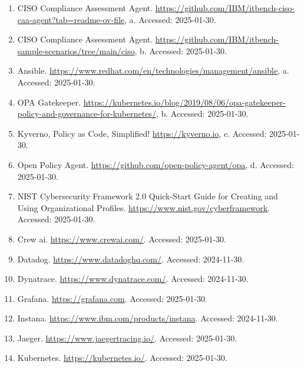 \documentclass[10pt,UTF8,fontset=fandol]{ctexart}
\begin{document}
\begin{enumerate}[leftmargin=2em,itemsep=2pt]

\item CISO Compliance Assessment Agent. \url{https://github.com/IBM/itbench-ciso-caa-agent?tab=readme-ov-file}, a. Accessed: 2025-01-30.

\item CISO Compliance Assessment Agent. \url{https://github.com/IBM/itbench-sample-scenarios/tree/main/ciso}, b. Accessed: 2025-01-30.

\item Ansible. \url{https://www.redhat.com/en/technologies/management/ansible}, a. Accessed: 2025-01-30.

\item OPA Gatekeeper. \url{https://kubernetes.io/blog/2019/08/06/opa-gatekeeper-policy-and-governance-for-kubernetes/}, b. Accessed: 2025-01-30.

\item Kyverno, Policy as Code, Simplified! \url{https://kyverno.io}, c. Accessed: 2025-01-30.

\item Open Policy Agent. \url{https://github.com/open-policy-agent/opa}, d. Accessed: 2025-01-30.

\item NIST Cybersecurity Framework 2.0 Quick-Start Guide for Creating and Using Organizational Profiles. \url{https://www.nist.gov/cyberframework}. Accessed: 2025-01-30.

\item Crew ai. \url{https://www.crewai.com/}. Accessed: 2025-01-30.

\item Datadog. \url{https://www.datadoghq.com/}. Accessed: 2024-11-30.

\item Dynatrace. \url{https://www.dynatrace.com/}. Accessed: 2024-11-30.

\item Grafana. \url{https://grafana.com}. Accessed: 2025-01-30.

\item Instana. \url{https://www.ibm.com/products/instana}. Accessed: 2024-11-30.

\item Jaeger. \url{https://www.jaegertracing.io/}. Accessed: 2025-01-30.

\item Kubernetes. \url{https://kubernetes.io/}. Accessed: 2025-01-30.


\end{enumerate}
\end{document}
